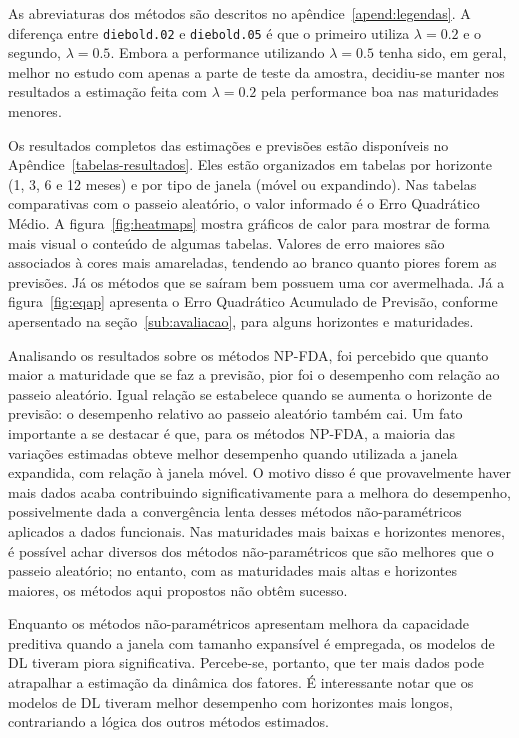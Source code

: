 \documentclass[
	12pt,				%
	openright,			%
	oneside,			%
	a4paper,			%
	english,			%
	brazil				%
	]{dissertacao-ufrgs-abntex2}
\begin{document}
As abreviaturas dos métodos são descritos no apêndice~\ref{apend:legendas}. A diferença entre \texttt{diebold.02} e \texttt{diebold.05} é que o primeiro utiliza $\lambda=0.2$ e o segundo, $\lambda=0.5$. Embora a performance utilizando $\lambda=0.5$ tenha sido, em geral, melhor no estudo com apenas a parte de teste da amostra, decidiu-se manter nos resultados a estimação feita com $\lambda=0.2$ pela performance boa nas maturidades menores.

Os resultados completos das estimações e previsões estão disponíveis no Apêndice~\ref{tabelas-resultados}. Eles estão organizados em tabelas por horizonte (1, 3, 6 e 12 meses) e por tipo de janela (móvel ou expandindo). Nas tabelas comparativas com o passeio aleatório, o valor informado é o Erro Quadrático Médio. A figura~\ref{fig:heatmaps} mostra gráficos de calor para mostrar de forma mais visual o conteúdo de algumas tabelas. Valores de erro maiores são associados à cores mais amareladas, tendendo ao branco quanto piores forem as previsões. Já os métodos que se saíram bem possuem uma cor avermelhada. Já a figura~\ref{fig:eqap} apresenta o Erro Quadrático Acumulado de Previsão, conforme apersentado na seção~\ref{sub:avaliacao}, para alguns horizontes e maturidades.

Analisando os resultados sobre os métodos NP-FDA, foi percebido que quanto maior a maturidade que se faz a previsão, pior foi o desempenho com relação ao passeio aleatório. Igual relação se estabelece quando se aumenta o horizonte de previsão: o desempenho relativo ao passeio aleatório também cai. Um fato importante a se destacar é que, para os métodos NP-FDA, a maioria das variações estimadas obteve melhor desempenho quando utilizada a janela expandida, com relação à janela móvel. O motivo disso é que provavelmente haver mais dados acaba contribuindo significativamente para a melhora do desempenho, possivelmente dada a convergência lenta desses métodos não-paramétricos aplicados a dados funcionais. 
Nas maturidades mais baixas e horizontes menores, é possível achar diversos dos métodos não-paramétricos que são melhores que o passeio aleatório; no entanto, com as maturidades mais altas e horizontes maiores, os métodos aqui propostos não obtêm sucesso.

Enquanto os métodos não-paramétricos apresentam melhora da capacidade preditiva quando a janela com tamanho expansível é empregada, os modelos de DL tiveram piora significativa. Percebe-se, portanto, que ter mais dados pode atrapalhar a estimação da dinâmica dos fatores. É interessante notar que os modelos de DL tiveram melhor desempenho com horizontes mais longos, contrariando a lógica dos outros métodos estimados.
\end{document}
